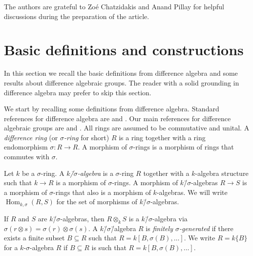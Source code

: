 \documentclass[oneside,reqno]{amsart}
\theoremstyle{definition}
\newcommand{\Hom}{\operatorname{Hom}}
\newcommand{\s}{\sigma}
\newcommand{\ks}{$k$\=/$\s$}
\newcommand{\mw}[1]{\todo[inline,color=green!20!white]{\textbf{Michael:} #1}}
\begin{document}
The authors are grateful to Zo\'{e} Chatzidakis and Anand Pillay for helpful discussions during the preparation of the article.




\section{Basic definitions and constructions}
\label{sec: Basic definition}





In this section we recall the basic definitions from difference algebra and some results about difference algebraic groups. The reader with a solid grounding in difference algebra may prefer to skip this section.



We start by recalling some definitions from difference algebra. Standard references for difference algebra are \cite{Cohn:difference} and \cite{Levin:difference}. Our main references for difference algebraic groups are \cite{Wibmer:FinitenessPropertiesOfAffineDifferenceAlgebraicGroups} and \cite{Wibmer:almostsimple}. All rings are assumed to be commutative and unital. A \emph{difference ring} (or \emph{$\s$-ring} for short) $R$ is a ring together with a ring endomorphism $\s\colon R\to R$. A morphism of $\s$-rings is a morphism of rings that commutes with $\s$.


Let $k$ be a $\s$-ring. A \emph{\ks-algebra} is a $\s$-ring $R$ together with a $k$-algebra structure such that $k\to R$ is a morphism of $\s$-rings. A morphism of \ks-algebras $R\to S$ is a morphism of $\s$-rings that also is a morphism of $k$-algebras. We will write $\Hom_{k,\s}(R,S)$ for the set of morphisms of \ks-algebras.

 If $R$ and $S$ are \ks-algebras, then $R\otimes_k S$ is a \ks-algebra via $\s(r\otimes s)=\s(r)\otimes \s(s)$. A \ks\=/algebra $R$ is \emph{finitely $\s$-generated} if there exists a finite subset $B\subseteq R$ such that $R=k[B,\s(B),\ldots]$. We write $R=k\{B\}$ for a $k$-$\s$-algebra $R$ if $B\subseteq R$ is such that $R=k[B,\s(B),\ldots]$.
\end{document}
